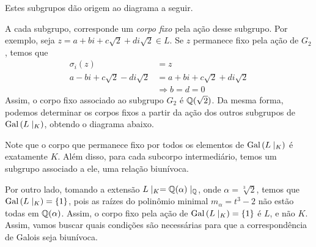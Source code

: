 Estes subgrupos dão origem ao diagrama a seguir.
\begin{center}
\end{center}
A cada subgrupo, corresponde um \emph{corpo fixo} pela ação desse subgrupo. Por exemplo, seja $z=a+bi+c\sqrt{2}+di\sqrt{2} \in L$. Se $z$ permanece fixo pela ação de $G_2$, temos que
\begin{align*}
    \sigma_{i}(z) &= z \\
    a-bi+c\sqrt{2}-di\sqrt{2} &= a+bi+c\sqrt{2}+di\sqrt{2} \\
    &\Rightarrow b=d=0
\end{align*}
Assim, o corpo fixo associado ao subgrupo $G_2$ é $\mathbb{Q}(\sqrt{2})$. Da mesma forma, podemos determinar os corpos fixos a partir da ação dos outros subgrupos de $\textrm{Gal}\left({L}\mid_{K}\right)$, obtendo o diagrama abaixo. \par Note que o corpo que permanece fixo por todos os elementos de $\textrm{Gal}\left({L}\mid_{K}\right)$ é exatamente $K$. Além disso, para cada subcorpo intermediário, temos um subgrupo associado a ele, uma relação biunívoca.
\begin{center}
\end{center} \par 
Por outro lado, tomando a extensão $L\mid_K =\mathbb{Q}(\alpha) \mid_{\mathbb{Q}}$, onde $\alpha = \sqrt[3]{2}$, temos que $\textrm{Gal}\left({L}\mid_{K}\right)=\{1\}$, pois as raízes do polinômio minimal $m_\alpha = t^3-2$ não estão todas em $\mathbb{Q}(\alpha)$. Assim, o corpo fixo pela ação de $\textrm{Gal}\left({L}\mid_{K}\right)=\{1\}$ é $L$, e não $K$. Assim, vamos buscar quais condições são necessárias para que a correspondência de Galois seja biunívoca. \label{ex:correspondencia} \par 
